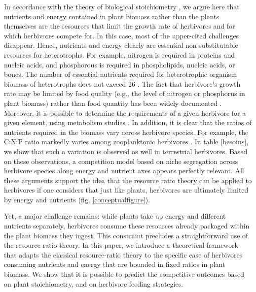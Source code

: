 \documentclass[12pt]{article}
\begin{document}
In accordance with the theory of biological stoichiometry \citep{sterner2002}, we argue here that nutrients and energy contained in plant biomass rather than the plants themselves are the resources that limit the growth rate of herbivores and for which herbivores compete for. In this case, most of the upper-cited challenges disappear. Hence, nutrients and energy  clearly are essential non-substitutable resources for heterotrophs. For example, nitrogen is required in proteins and nucleic acids, and phosphorous is required in phospholipids, nucleic acids, or bones. The number of essential nutrients required for heterotrophic organism biomass of heterotrophs does not exceed 26 \citep{sterner2002}. The fact that herbivore's growth rate may be limited by food quality (e.g., the level of nitrogen or phosphorus in plant biomass) rather than food quantity has been widely documented \citep{Sterner1992, Hessen1992, Urabe1992}. Moreover, it is possible  to determine the requirements of a given herbivore for a given element, using metabolism studies \citep{Mould1981}. In addition, it is clear that the ratios of nutrients required in the biomass vary across herbivore species. For example, the C:N:P ratio markedly varies among zooplanktonic herbivores \citep{Andersen1991, Sterner1992}. 
In table \ref{besoins}, we show that such a variation is observed as well in terrestrial herbivores. 
Based on these observations, a competition model based on niche segregation across herbivore species along energy and nutrient axes appears perfectly relevant. All these arguments support the idea that the resource ratio theory can be applied to herbivores if one considers that just like plants, herbivores are ultimately limited by energy and nutrients (fig. \ref{conceptualfigure}). \par 

Yet, a major challenge remains: while plants take up energy and different nutrients separately, herbivores consume these resources already packaged within the plant biomass they ingest. This constraint precludes a straightforward use of the resource ratio theory. 
In this paper, we introduce a theoretical framework that adapts  the classical resource-ratio theory to the specific case of herbivores consuming nutrients  and energy  that are bounded in fixed ratios in plant biomass. We show that it is possible to predict the competitive outcomes based on  plant  stoichiometry, and on herbivore feeding strategies. %
 
\end{document}
